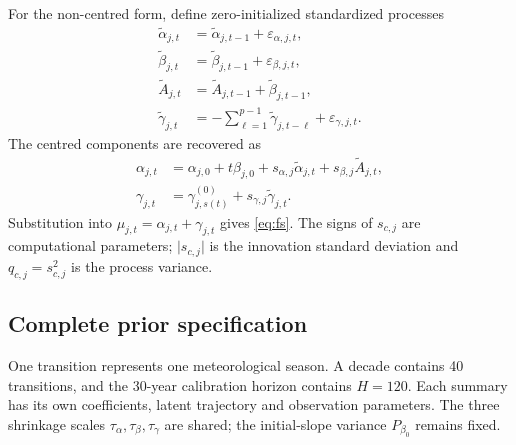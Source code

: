 \documentclass[11pt,a4paper]{article}
\begin{document}
	For the non-centred form, define zero-initialized standardized processes
	\begin{align}
		\widetilde\alpha_{j,t}
		&=\widetilde\alpha_{j,t-1}
		+\varepsilon_{\alpha,j,t},\nonumber\\
		\widetilde\beta_{j,t}
		&=\widetilde\beta_{j,t-1}
		+\varepsilon_{\beta,j,t},\nonumber\\
		\widetilde A_{j,t}
		&=\widetilde A_{j,t-1}
		+\widetilde\beta_{j,t-1},\nonumber\\
		\widetilde\gamma_{j,t}
		&=-\sum_{\ell=1}^{p-1}
		\widetilde\gamma_{j,t-\ell}
		+\varepsilon_{\gamma,j,t}.
		\label{eq:supp-standardized-states}
	\end{align}
	The centred components are recovered as
	\begin{align}
		\alpha_{j,t}
		&=\alpha_{j,0}+t\beta_{j,0}
		+s_{\alpha,j}\widetilde\alpha_{j,t}
		+s_{\beta,j}\widetilde A_{j,t},\nonumber\\
		\gamma_{j,t}
		&=\gamma^{(0)}_{j,s(t)}
		+s_{\gamma,j}\widetilde\gamma_{j,t}.
		\label{eq:supp-centred-reconstruction}
	\end{align}
	Substitution into \(\mu_{j,t}=\alpha_{j,t}+\gamma_{j,t}\) gives
	\cref{eq:fs}. The signs of \(s_{c,j}\) are computational parameters;
	\(\lvert s_{c,j}\rvert\) is the innovation standard deviation and
	\(q_{c,j}=s_{c,j}^2\) is the process variance.
	
	\subsection{Complete prior specification}

One transition represents one meteorological season. A decade contains
40 transitions, and the 30-year calibration horizon contains \(H=120\).
Each summary has its own coefficients, latent trajectory and observation
parameters. The three shrinkage scales \(\tau_\alpha,\tau_\beta,\tau_\gamma\)
are shared; the initial-slope variance \(P_{\beta_0}\) remains fixed.
\end{document}
